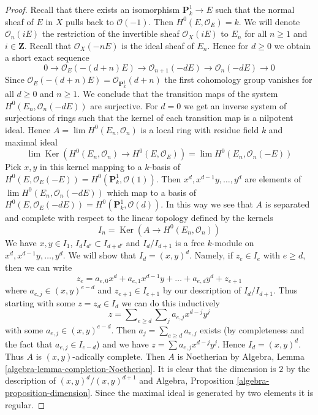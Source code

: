 \documentclass[10pt,a4paper]{amsart}
\theoremstyle{plain}
\theoremstyle{definition}
\theoremstyle{remark}
\numberwithin{equation}{subsection}
\def\lim{\mathop{\mathrm{lim}}\nolimits}
\def\Ker{\mathop{\mathrm{Ker}}}
\begin{document}
\begin{proof}
Recall that there exists an isomorphism $\mathbf{P}^1_k \to E$
such that the normal sheaf of $E$ in $X$ pulls back to $\mathcal{O}(-1)$.
Then $H^0(E, \mathcal{O}_E) = k$.
We will denote $\mathcal{O}_n(iE)$ the restriction of the invertible
sheaf $\mathcal{O}_X(iE)$ to $E_n$ for all $n \geq 1$ and $i \in \mathbf{Z}$.
Recall that $\mathcal{O}_X(-nE)$ is the ideal sheaf of $E_n$. Hence
for $d \geq 0$ we obtain a short exact sequence
$$
0 \to \mathcal{O}_E(-(d + n)E) \to
\mathcal{O}_{n + 1}(-dE) \to
\mathcal{O}_n(-dE) \to 0
$$
Since $\mathcal{O}_E(-(d + n)E) = \mathcal{O}_{\mathbf{P}^1_k}(d + n)$
the first cohomology group vanishes for all $d \geq 0$ and $n \geq 1$.
We conclude that the transition maps of the system
$H^0(E_n, \mathcal{O}_n(-dE))$ are surjective. For $d = 0$
we get an inverse system of surjections of rings such that the
kernel of each transition map is a nilpotent ideal.
Hence $A = \lim H^0(E_n, \mathcal{O}_n)$ is a local ring
with residue field $k$ and maximal ideal
$$
\lim \Ker(H^0(E_n, \mathcal{O}_n) \to H^0(E, \mathcal{O}_E)) =
\lim H^0(E_n, \mathcal{O}_n(-E))
$$
Pick $x, y$ in this kernel mapping to a $k$-basis of
$H^0(E, \mathcal{O}_E(-E)) = H^0(\mathbf{P}^1_k, \mathcal{O}(1))$.
Then $x^d, x^{d - 1}y, \ldots, y^d$ are
elements of $\lim H^0(E_n, \mathcal{O}_n(-dE))$ which map to a basis
of $H^0(E, \mathcal{O}_E(-dE)) = H^0(\mathbf{P}^1_k, \mathcal{O}(d))$.
In this way we see that $A$ is separated and complete with respect
to the linear topology defined by the kernels
$$
I_n = \Ker(A \longrightarrow H^0(E_n, \mathcal{O}_n))
$$
We have $x, y \in I_1$, $I_d I_{d'} \subset I_{d + d'}$
and $I_d/I_{d + 1}$ is a free $k$-module on $x^d, x^{d - 1}y, \ldots, y^d$.
We will show that $I_d = (x, y)^d$. Namely, if $z_e \in I_e$ with
$e \geq d$, then we can write
$$
z_e = a_{e, 0} x^d + a_{e, 1} x^{d - 1}y + \ldots + a_{e, d}y^d + z_{e + 1}
$$
where $a_{e, j} \in (x, y)^{e - d}$ and $z_{e + 1} \in I_{e + 1}$
by our description of $I_d/I_{d + 1}$. Thus starting with some
$z = z_d \in I_d$ we can do this inductively
$$
z = \sum\nolimits_{e \geq d} \sum\nolimits_j a_{e, j} x^{d - j} y^j
$$
with some $a_{e, j} \in (x, y)^{e - d}$. Then $a_j = \sum_{e \geq d} a_{e, j}$
exists (by completeness and the fact that $a_{e, j} \in I_{e - d}$)
and we have $z = \sum a_{e, j} x^{d - j} y^j$.
Hence $I_d = (x, y)^d$.
Thus $A$ is $(x, y)$-adically complete. Then $A$ is
Noetherian by Algebra, Lemma \ref{algebra-lemma-completion-Noetherian}.
It is clear that the dimension is $2$ by the description
of $(x, y)^d/(x, y)^{d + 1}$ and
Algebra, Proposition \ref{algebra-proposition-dimension}.
Since the maximal ideal
is generated by two elements it is regular.
\end{proof}
\end{document}
